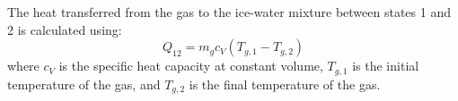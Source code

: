The heat transferred from the gas to the ice-water mixture between states 1 and 2 is calculated using:  
\[
Q_{12} = m_g c_V (T_{g,1} - T_{g,2})
\]  
where \( c_V \) is the specific heat capacity at constant volume, \( T_{g,1} \) is the initial temperature of the gas, and \( T_{g,2} \) is the final temperature of the gas.
